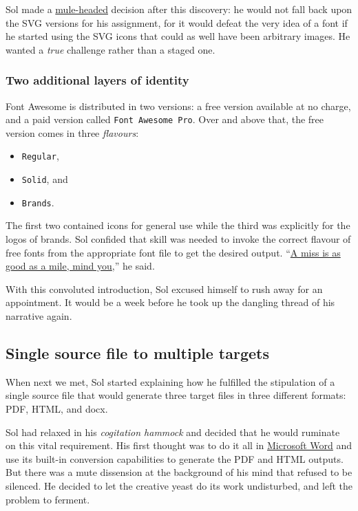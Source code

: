 \documentclass[
  british,
  a4paper,
  rgb,
  dvipsnames,
  svgnames,
  hyphens]{article}
\providecommand{\tightlist}{%
  \setlength{\itemsep}{0pt}\setlength{\parskip}{0pt}}
\begin{document}
Sol made a
\href{https://www.lexico.com/definition/mule-headed}{mule-headed}
decision after this discovery: he would not fall back upon the SVG
versions for his assignment, for it would defeat the very idea of a font
if he started using the SVG icons that could as well have been arbitrary
images. He wanted a \emph{true} challenge rather than a staged one.

\hypertarget{two-additional-layers-of-identity}{%
\subsubsection{Two additional layers of
identity}\label{two-additional-layers-of-identity}}

Font Awesome is distributed in two versions: a free version available at
no charge, and a paid version called \texttt{Font\ Awesome\ Pro}. Over
and above that, the free version comes in three \emph{flavours}:

\begin{itemize}
\tightlist
\item
  \texttt{Regular},
\item
  \texttt{Solid}, and
\item
  \texttt{Brands}.
\end{itemize}

The first two contained icons for general use while the third was
explicitly for the logos of brands. Sol confided that skill was needed
to invoke the correct flavour of free fonts from the appropriate font
file to get the desired output.
``\href{https://idioms.thefreedictionary.com/a+miss+is+as+good+as+a+mile}{A
miss is as good as a mile, mind you},'' he said.

With this convoluted introduction, Sol excused himself to rush away for
an appointment. It would be a week before he took up the dangling thread
of his narrative again.

\hypertarget{single-source-file-to-multiple-targets}{%
\subsection{Single source file to multiple
targets}\label{single-source-file-to-multiple-targets}}

When next we met, Sol started explaining how he fulfilled the
stipulation of a single source file that would generate three target
files in three different formats: PDF, HTML, and docx.

Sol had relaxed in his \emph{cogitation hammock} and decided that he
would ruminate on this vital requirement. His first thought was to do it
all in
\href{https://www.microsoft.com/en-in/microsoft-365/word}{Microsoft
Word} and use its built-in conversion capabilities to generate the PDF
and HTML outputs. But there was a mute dissension at the background of
his mind that refused to be silenced. He decided to let the creative
yeast do its work undisturbed, and left the problem to ferment.
\end{document}
